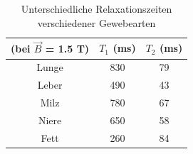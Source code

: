 \begin{table}
	\centering
		\begin{tabular}{|c|c|c|}
			\hline
			(bei $\vec{B}$ = 1.5 T) & $T_1$ (ms) & $T_2$ (ms) \\
			\hline
			Lunge & 830 & 79 \\
			Leber & 490 & 43 \\
			Milz & 780 & 67 \\
			Niere & 650 & 58 \\
			Fett & 260 & 84 \\	
			\hline	
		\end{tabular}
		\caption{Unterschiedliche Relaxationszeiten verschiedener Gewebearten}
		\label{mri:quant:tab:zeiten}
\end{table}
%









